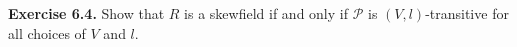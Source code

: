 \textbf{Exercise 6.4.} Show that $R$ is a skewfield if and only if $\mathcal{P}$ is $(V, l)$-transitive for all choices of $V$ and $l$.
